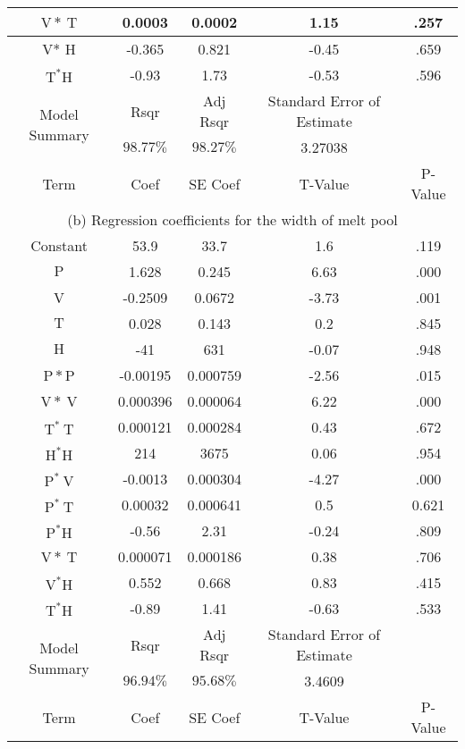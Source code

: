 \documentclass[10pt]{article}
\begin{document}
\begin{center}
\begin{tabular}{|c|c|c|c|c|}
\hline
$\mathrm{V} * \mathrm{~T}$ & 0.0003 & 0.0002 & 1.15 & .257 \\
\hline
V* $\mathrm{H}$ & -0.365 & 0.821 & -0.45 & .659 \\
\hline
$\mathrm{T}^{*} \mathrm{H}$ & -0.93 & 1.73 & -0.53 & .596 \\
\hline
\multirow[t]{2}{*}{Model Summary} & Rsqr & Adj Rsqr & Standard Error of Estimate &  \\
\hline
 & $98.77 \%$ & $98.27 \%$ & 3.27038 &  \\
\hline
Term & Coef & SE Coef & T-Value & P-Value \\
\hline
\multicolumn{5}{|c|}{(b) Regression coefficients for the width of melt pool} \\
\hline
Constant & 53.9 & 33.7 & 1.6 & .119 \\
\hline
$\mathrm{P}$ & 1.628 & 0.245 & 6.63 & .000 \\
\hline
V & -0.2509 & 0.0672 & -3.73 & .001 \\
\hline
$\mathrm{T}$ & 0.028 & 0.143 & 0.2 & .845 \\
\hline
$\mathrm{H}$ & -41 & 631 & -0.07 & .948 \\
\hline
$\mathrm{P} * \mathrm{P}$ & -0.00195 & 0.000759 & -2.56 & .015 \\
\hline
$\mathrm{V} * \mathrm{~V}$ & 0.000396 & 0.000064 & 6.22 & .000 \\
\hline
$\mathrm{T}^{*} \mathrm{~T}$ & 0.000121 & 0.000284 & 0.43 & .672 \\
\hline
$\mathrm{H}^{*} \mathrm{H}$ & 214 & 3675 & 0.06 & .954 \\
\hline
$\mathrm{P}^{*} \mathrm{~V}$ & -0.0013 & 0.000304 & -4.27 & .000 \\
\hline
$\mathrm{P}^{*} \mathrm{~T}$ & 0.00032 & 0.000641 & 0.5 & 0.621 \\
\hline
$\mathrm{P}^{*} \mathrm{H}$ & -0.56 & 2.31 & -0.24 & .809 \\
\hline
$\mathrm{V} * \mathrm{~T}$ & 0.000071 & 0.000186 & 0.38 & .706 \\
\hline
$\mathrm{V}^{*} \mathrm{H}$ & 0.552 & 0.668 & 0.83 & .415 \\
\hline
$\mathrm{T}^{*} \mathrm{H}$ & -0.89 & 1.41 & -0.63 & .533 \\
\hline
\multirow[t]{2}{*}{Model Summary} & Rsqr & Adj Rsqr & Standard Error of Estimate &  \\
\hline
 & $96.94 \%$ & $95.68 \%$ & 3.4609 &  \\
\hline
Term & Coef & SE Coef & T-Value & P-Value \\

\end{tabular}
\end{center}
\end{document}
